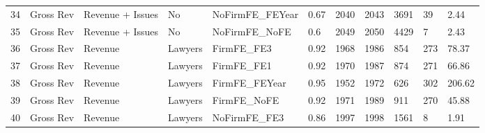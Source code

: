 \begin{table}[ht]
\begin{tabular}{rllllllllll}
  34 & Gross Rev & Revenue + Issues & No & NoFirmFE\_FEYear & 0.67 & 2040 & 2043 & 3691 & 39 & 2.44 \\ 
  35 & Gross Rev & Revenue + Issues & No & NoFirmFE\_NoFE & 0.6 & 2049 & 2050 & 4429 & 7 & 2.43 \\ 
  36 & Gross Rev & Revenue & Lawyers & FirmFE\_FE3 & 0.92 & 1968 & 1986 & 854 & 273 & 78.37 \\ 
  37 & Gross Rev & Revenue & Lawyers & FirmFE\_FE1 & 0.92 & 1970 & 1987 & 874 & 271 & 66.86 \\ 
  38 & Gross Rev & Revenue & Lawyers & FirmFE\_FEYear & 0.95 & 1952 & 1972 & 626 & 302 & 206.62 \\ 
  39 & Gross Rev & Revenue & Lawyers & FirmFE\_NoFE & 0.92 & 1971 & 1989 & 911 & 270 & 45.88 \\ 
  40 & Gross Rev & Revenue & Lawyers & NoFirmFE\_FE3 & 0.86 & 1997 & 1998 & 1561 & 8 & 1.91 \\ 
   \hline
\end{tabular}
\end{table}
